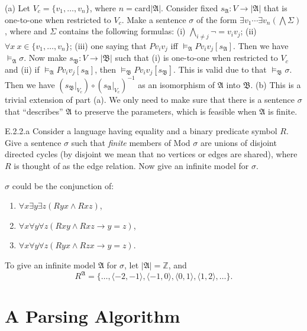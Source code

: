 (a) Let $V_c=\{v_1,\dots,v_n\}$, where $n=\mathrm{card}|\mathfrak{A}|$. Consider fixed $s_{\mathfrak{A}}:V\to|\mathfrak{A}|$ that is one-to-one when restricted to $V_c$.  Make a sentence $\sigma$ of the form $\exists v_1\cdots\exists v_n(\bigwedge \Sigma)$, where  and $\Sigma$ contains the following formulas: (i) $\bigwedge_{i\neq j}\neg =v_iv_j$; (ii) $\forall x\ x\in\{v_1,\dots,v_n\}$; (iii) one saying that $Pv_iv_j$ iff $\vDash_{\mathfrak{A}}Pv_iv_j[s_{\mathfrak{A}}]$. Then we have $\vDash_{\mathfrak{A}}\sigma$. Now make $s_{\mathfrak{B}}:V\to|\mathfrak{B}|$ such that (i) is one-to-one when restricted to $V_c$ and (ii) if $\vDash_{\mathfrak{A}}Pv_iv_j[s_{\mathfrak{A}}]$, then $\vDash_{\mathfrak{B}}Pv_iv_j[s_{\mathfrak{B}}]$. This is valid due to that $\vDash_{\mathfrak{B}}\sigma$. Then we have $(s_{\mathfrak{B}}|_{V_c})\circ(s_{\mathfrak{A}}|_{V_c})^{-1}$ as an isomorphism of $\mathfrak{A}$ into $\mathfrak{B}$.
(b) This is a trivial extension of part (a). We only need to make sure that there is a sentence $\sigma$ that ``describes'' $\mathfrak{A}$ to preserve the parameters, which is feasible when $\mathfrak{A}$ is finite.

\setcounter{exercise}{100}
\begin{exercise}{E.2.2.a}
  Consider a language having equality and a binary predicate symbol $R$. Give a sentence $\sigma$ such that \textit{finite} members of Mod $\sigma$ are unions of disjoint directed cycles (by disjoint we mean that no vertices or edges are shared), where $R$ is thought of as the edge relation. Now give an infinite model for $\sigma$.
\end{exercise}

$\sigma$ could be the conjunction of:
\begin{enumerate}[label=(\alph*)]
  \item $\forall x\exists y\exists z(Ryx\wedge Rxz)$,
  \item $\forall x\forall y\forall z(Rxy\wedge Rxz\to y=z)$,
  \item $\forall x\forall y\forall z(Ryx\wedge Rzx\to y=z)$.
\end{enumerate}

To give an infinite model $\mathfrak{A}$ for $\sigma$, let $|\mathfrak{A}|= \mathbb{Z}$, and
\[
  R^{\mathfrak{A}}=\{\dots,\langle -2,-1\rangle,\langle -1,0\rangle,\langle 0,1\rangle,\langle 1,2\rangle,\dots\}.
\]

\section{A Parsing Algorithm}\label{sec:2.3}

